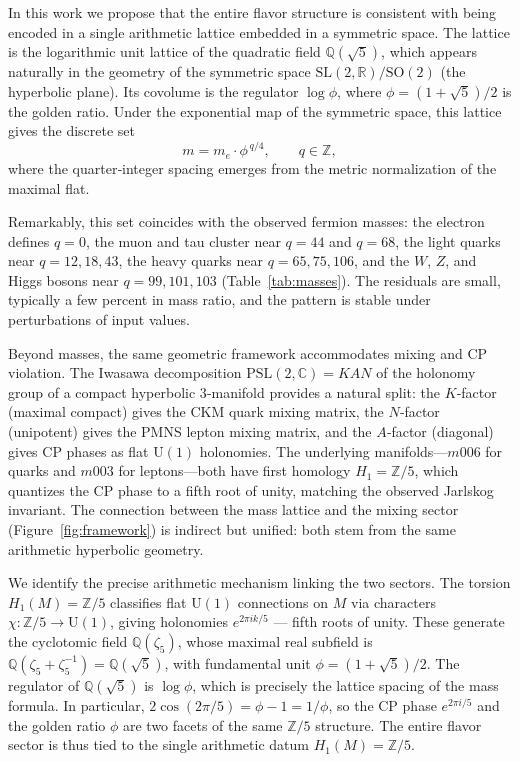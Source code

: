 \documentclass[12pt]{article}
\theoremstyle{definition}
\begin{document}
In this work we propose that the entire flavor structure is consistent with being encoded in a single arithmetic lattice embedded in a symmetric space. The lattice is the logarithmic unit lattice of the quadratic field $\mathbb{Q}(\sqrt5)$, which appears naturally in the geometry of the symmetric space $\mathrm{SL}(2,\mathbb{R})/\mathrm{SO}(2)$ (the hyperbolic plane). Its covolume is the regulator $\log\phi$, where $\phi = (1+\sqrt5)/2$ is the golden ratio. Under the exponential map of the symmetric space, this lattice gives the discrete set
\[
m = m_e \cdot \phi^{\,q/4},\qquad q\in\mathbb{Z},
\]
where the quarter‑integer spacing emerges from the metric normalization of the maximal flat.

Remarkably, this set coincides with the observed fermion masses: the electron defines $q=0$, the muon and tau cluster near $q=44$ and $q=68$, the light quarks near $q=12,18,43$, the heavy quarks near $q=65,75,106$, and the $W$, $Z$, and Higgs bosons near $q=99,101,103$ (Table~\ref{tab:masses}). The residuals are small, typically a few percent in mass ratio, and the pattern is stable under perturbations of input values.

Beyond masses, the same geometric framework accommodates mixing and CP violation. The Iwasawa decomposition $\mathrm{PSL}(2,\mathbb{C}) = KAN$ of the holonomy group of a compact hyperbolic 3‑manifold provides a natural split: the $K$‑factor (maximal compact) gives the CKM quark mixing matrix, the $N$‑factor (unipotent) gives the PMNS lepton mixing matrix, and the $A$‑factor (diagonal) gives CP phases as flat $\mathrm{U}(1)$ holonomies. The underlying manifolds—$m006$ for quarks and $m003$ for leptons—both have first homology $H_1 = \mathbb{Z}/5$, which quantizes the CP phase to a fifth root of unity, matching the observed Jarlskog invariant. The connection between the mass lattice and the mixing sector (Figure~\ref{fig:framework}) is indirect but unified: both stem from the same arithmetic hyperbolic geometry.

We identify the precise arithmetic mechanism linking the two sectors. The torsion $H_1(M)=\mathbb{Z}/5$ classifies flat $\mathrm{U}(1)$ connections on $M$ via characters $\chi: \mathbb{Z}/5 \to \mathrm{U}(1)$, giving holonomies $e^{2\pi i k/5}$ --- fifth roots of unity. These generate the cyclotomic field $\mathbb{Q}(\zeta_5)$, whose maximal real subfield is $\mathbb{Q}(\zeta_5 + \zeta_5^{-1}) = \mathbb{Q}(\sqrt{5})$, with fundamental unit $\phi = (1+\sqrt{5})/2$. The regulator of $\mathbb{Q}(\sqrt{5})$ is $\log\phi$, which is precisely the lattice spacing of the mass formula. In particular, $2\cos(2\pi/5) = \phi - 1 = 1/\phi$, so the CP phase $e^{2\pi i/5}$ and the golden ratio $\phi$ are two facets of the same $\mathbb{Z}/5$ structure. The entire flavor sector is thus tied to the single arithmetic datum $H_1(M) = \mathbb{Z}/5$.
\end{document}
